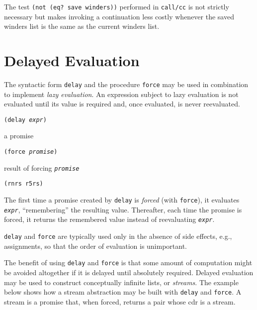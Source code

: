 The test \texttt{(not (eq? save winders))} performed in \texttt{call/cc}
is not strictly necessary but makes invoking a continuation
less costly whenever the saved winders list is the same as the
current winders list.


\section{\label{control_g103}\label{control_h7}Delayed Evaluation\label{control_SECTDELAYED}}



The syntactic form \texttt{delay} and the procedure \texttt{force} may be used in
combination to implement \label{control_s64}\textit{lazy evaluation}.
An expression subject to lazy evaluation is not evaluated until its value is
required and, once evaluated, is never reevaluated.


\begin{description}

\label{control_s65}\item[syntax] \texttt{(delay \textit{expr})}



\item[returns] a promise


\item[procedure] \texttt{(force \textit{promise})}



\item[returns] result of forcing \texttt{\textit{promise}}


\item[libraries] \texttt{(rnrs r5rs)}
\end{description}


The first time a promise created by \texttt{delay} is \textit{forced} (with
\texttt{force}), it evaluates \texttt{\textit{expr}}, ``remembering'' the resulting
value.
Thereafter, each time the promise is forced, it returns the remembered
value instead of reevaluating \texttt{\textit{expr}}.

\texttt{delay} and \texttt{force} are typically used only in the absence of side
effects, e.g., assignments, so that the order of evaluation is unimportant.

The benefit of using \texttt{delay} and \texttt{force} is that some
amount of computation might be avoided altogether if it is delayed until
absolutely required.
Delayed evaluation may be used to construct conceptually infinite
lists, or \label{control_s66}\textit{streams}.
The example below shows how a stream abstraction may be built with
\texttt{delay} and \texttt{force}.
A stream is a promise that, when forced, returns a pair whose cdr
is a stream.


